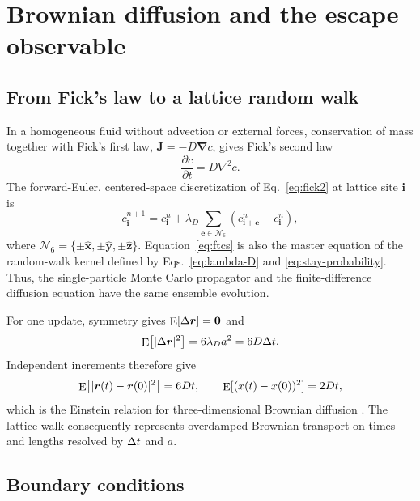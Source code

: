 \section{Brownian diffusion and the escape observable}
\label{sec:diffusion}

\subsection{From Fick's law to a lattice random walk}

In a homogeneous fluid without advection or external forces, conservation of
mass together with Fick's first law, $\bm J=-D\bm\nabla c$, gives Fick's second
law
\begin{equation}
 \frac{\partial c}{\partial t}=D\nabla^2c.
 \label{eq:fick2}
\end{equation}
The forward-Euler, centered-space discretization of Eq.~\ref{eq:fick2} at
lattice site $\bm i$ is
\begin{equation}
 c_{\bm i}^{n+1}
 =c_{\bm i}^{n}
 +\lambda_D\sum_{\bm e\in\mathcal N_6}
 \left(c_{\bm i+\bm e}^{n}-c_{\bm i}^{n}\right),
 \label{eq:ftcs}
\end{equation}
where $\mathcal N_6=\{\pm\hat{\bm x},\pm\hat{\bm y},\pm\hat{\bm z}\}$.
Equation~\ref{eq:ftcs} is also the master equation of the random-walk kernel
defined by Eqs.~\ref{eq:lambda-D} and \ref{eq:stay-probability}.  Thus, the
single-particle Monte Carlo propagator and the finite-difference diffusion
equation have the same ensemble evolution.

For one update, symmetry gives $\mathop{\mathrm{E}}[\Delta\bm r]=\bm 0$ and
\begin{equation}
 \mathop{\mathrm{E}}\!\left[\lvert\Delta\bm r\rvert^2\right]
 =6\lambda_Da^2=6D\Delta t.
 \label{eq:one-step-msd}
\end{equation}
Independent increments therefore give
\begin{equation}
 \mathop{\mathrm{E}}\!\left[\lvert\bm r(t)-\bm r(0)\rvert^2\right]=6Dt,
 \qquad
 \mathop{\mathrm{E}}[(x(t)-x(0))^2]=2Dt,
 \label{eq:einstein-msd}
\end{equation}
which is the Einstein relation for three-dimensional Brownian diffusion
\citep{einstein1905}.  The lattice walk consequently represents overdamped
Brownian transport on times and lengths resolved by $\Delta t$ and $a$.

\subsection{Boundary conditions}

